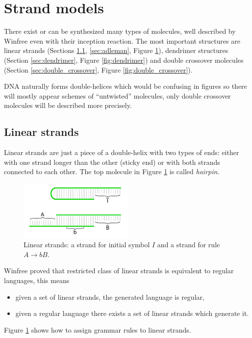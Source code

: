 \section{Strand models}
\label{sec:strand}
	
	There exist or can be synthesized many types of molecules, well described by Winfree \cite{winfree_comp} even with their inception reaction. The most important structures are linear strands (Sections \ref{sec:lin_strands}, \ref{sec:adleman}, Figure \ref{fig:linear}), dendrimer structures (Section \ref{sec:dendrimer}, Figure \ref{fig:dendrimer}) and double crossover molecules (Section \ref{sec:double_crossover}, Figure \ref{fig:double_crossover}).
	\begin{note}\label{note:untwist}
		DNA naturally forms double-helices which would be confusing in figures so there will mostly appear schemes of ``untwisted'' molecules, only double crossover molecules will be described more precisely. %
	\end{note}
	
	\subsection{Linear strands}
	\label{sec:lin_strands}
		
		Linear strands are just a piece of a double-helix with two types of ends: either with one strand longer than the other (sticky end) or with both strands connected to each other. The top molecule in Figure \ref{fig:linear} is called {\em hairpin}.
		\begin{figure}[h]
		\begin{center}
			\includegraphics[width=0.502\textwidth]{./figures/strand_types/linear.pdf} %
			\caption{Linear strands: a strand for initial symbol $I$ and a strand for rule $A\rightarrow bB$.}
			\label{fig:linear}
		\end{center}
		\end{figure}
		Winfree \cite{winfree_phd} proved that restricted class of linear strands is equivalent to regular languages, this means
		\begin{itemize}
			\item given a set of linear strands, the generated language is regular,
			\item given a regular language there exists a set of linear strands which generate it.
		\end{itemize}
		Figure \ref{fig:linear} shows how to assign grammar rules to linear strands.
	
